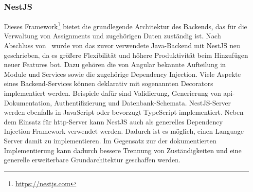 \subsubsection{NestJS}
Dieses Framework\footnote{\url{https://nestjs.com}} bietet die grundlegende Architektur des Backends, das für die Verwaltung von Assignments und zugehörigen Daten zuständig ist.
Nach Abschluss von~\cite{bachelor-thesis} wurde von das zuvor verwendete Java-Backend mit NestJS neu geschrieben, da es größere Flexibilität und höhere Produktivität beim Hinzufügen neuer Features bot.
Dazu gehören die von Angular bekannte Aufteilung in Module und Services sowie die zugehörige Dependency Injection.
Viele Aspekte eines Backend-Services können deklarativ mit sogenannten Decorators implementiert werden.
Beispiele dafür sind Validierung, Generierung von \ac{api}-Dokumentation, Authentifizierung und Datenbank-Schemata.
NestJS-Server werden ebenfalls in JavaScript oder bevorzugt TypeScript implementiert.
Neben dem Einsatz für \ac{http}-Server kann NestJS auch als generelles Dependency Injection-Framework verwendet werden.
Dadurch ist es möglich, einen Language Server damit zu implementieren.
Im Gegensatz zur der dokumentierten\cite{vsc-language-server-guide} Implementierung kann dadurch bessere Trennung von Zuständigkeiten und eine generelle erweiterbare Grundarchitektur geschaffen werden.
